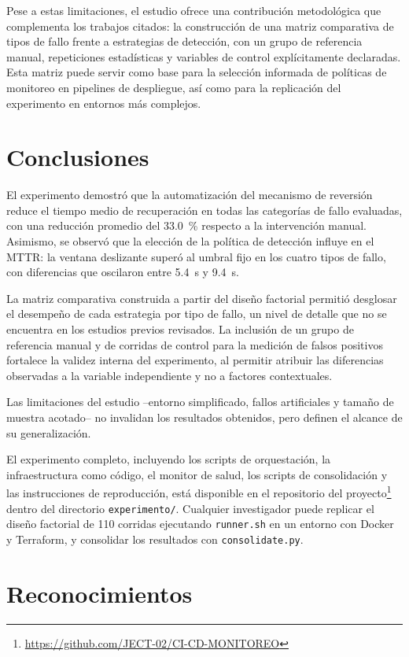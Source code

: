 \documentclass[conference]{IEEEtran}
\begin{document}
Pese a estas limitaciones, el estudio ofrece una contribuci\'on metodol\'ogica que complementa los trabajos citados: la construcci\'on de una matriz comparativa de tipos de fallo frente a estrategias de detecci\'on, con un grupo de referencia manual, repeticiones estad\'isticas y variables de control expl\'icitamente declaradas. Esta matriz puede servir como base para la selecci\'on informada de pol\'iticas de monitoreo en pipelines de despliegue, as\'i como para la replicaci\'on del experimento en entornos m\'as complejos.

\section{Conclusiones}

El experimento demostr\'o que la automatizaci\'on del mecanismo de reversi\'on reduce el tiempo medio de recuperaci\'on en todas las categor\'ias de fallo evaluadas, con una reducci\'on promedio del 33.0~\% respecto a la intervenci\'on manual. Asimismo, se observ\'o que la elecci\'on de la pol\'itica de detecci\'on influye en el MTTR: la ventana deslizante super\'o al umbral fijo en los cuatro tipos de fallo, con diferencias que oscilaron entre 5.4~s y 9.4~s.

La matriz comparativa construida a partir del dise\~no factorial permiti\'o desglosar el desempe\~no de cada estrategia por tipo de fallo, un nivel de detalle que no se encuentra en los estudios previos revisados. La inclusi\'on de un grupo de referencia manual y de corridas de control para la medici\'on de falsos positivos fortalece la validez interna del experimento, al permitir atribuir las diferencias observadas a la variable independiente y no a factores contextuales.

Las limitaciones del estudio --entorno simplificado, fallos artificiales y tama\~no de muestra acotado-- no invalidan los resultados obtenidos, pero definen el alcance de su generalizaci\'on.

El experimento completo, incluyendo los scripts de orquestaci\'on, la infraestructura como c\'odigo, el monitor de salud, los scripts de consolidaci\'on y las instrucciones de reproducci\'on, est\'a disponible en el repositorio del proyecto\footnote{\url{https://github.com/JECT-02/CI-CD-MONITOREO}} dentro del directorio \texttt{experimento/}. Cualquier investigador puede replicar el dise\~no factorial de 110 corridas ejecutando \texttt{runner.sh} en un entorno con Docker y Terraform, y consolidar los resultados con \texttt{consolidate.py}.

\section*{Reconocimientos}



\end{document}
